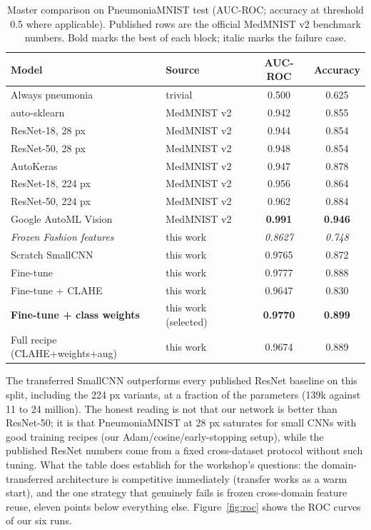 \documentclass[11pt,a4paper]{article}
\begin{document}
\begin{table}[h]
\centering
\caption{Master comparison on PneumoniaMNIST test (AUC-ROC; accuracy at threshold 0.5 where applicable). Published rows are the official MedMNIST v2 benchmark numbers. Bold marks the best of each block; italic marks the failure case.}
\label{tab:master}
\begin{tabular}{llcc}
\toprule
Model & Source & AUC-ROC & Accuracy \\
\midrule
Always pneumonia & trivial & 0.500 & 0.625 \\
auto-sklearn & MedMNIST v2 & 0.942 & 0.855 \\
ResNet-18, 28 px & MedMNIST v2 & 0.944 & 0.854 \\
ResNet-50, 28 px & MedMNIST v2 & 0.948 & 0.854 \\
AutoKeras & MedMNIST v2 & 0.947 & 0.878 \\
ResNet-18, 224 px & MedMNIST v2 & 0.956 & 0.864 \\
ResNet-50, 224 px & MedMNIST v2 & 0.962 & 0.884 \\
Google AutoML Vision & MedMNIST v2 & \textbf{0.991} & \textbf{0.946} \\
\midrule
\emph{Frozen Fashion features} & this work & \emph{0.8627} & \emph{0.748} \\
Scratch SmallCNN & this work & 0.9765 & 0.872 \\
Fine-tune & this work & 0.9777 & 0.888 \\
Fine-tune + CLAHE & this work & 0.9647 & 0.830 \\
\textbf{Fine-tune + class weights} & this work (selected) & \textbf{0.9770} & \textbf{0.899} \\
Full recipe (CLAHE+weights+aug) & this work & 0.9674 & 0.889 \\
\bottomrule
\end{tabular}
\end{table}

The transferred SmallCNN outperforms every published ResNet baseline on this split, including the 224 px variants, at a fraction of the parameters (139k against 11 to 24 million). The honest reading is not that our network is better than ResNet-50; it is that PneumoniaMNIST at 28 px saturates for small CNNs with good training recipes (our Adam/cosine/early-stopping setup), while the published ResNet numbers come from a fixed cross-dataset protocol without such tuning. What the table does establish for the workshop's questions: the domain-transferred architecture is competitive immediately (transfer works as a warm start), and the one strategy that genuinely fails is frozen cross-domain feature reuse, eleven points below everything else. Figure~\ref{fig:roc} shows the ROC curves of our six runs.
\end{document}
